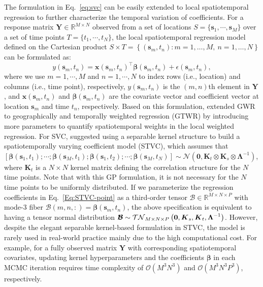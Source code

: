 \documentclass[12pt]{article}
\newcommand{\R}{\mathbb{R}}
\newcommand{\bd}[1]{\boldsymbol{#1}}
\begin{document}
The formulation in Eq.~\eqref{eq:svc} can be easily extended to local spatiotemporal regression to further characterize the temporal variation of coefficients. For a response matrix  $\boldsymbol{Y}\in\mathbb{R}^{M\times N}$ observed from a set of locations $S=\{\bd{s}_1,\cdots,\bd{s}_M\}$ over a set of time points $T=\{t_1,\cdots,t_N\}$, the local spatiotemporal regression model defined on the Cartesian product $S \times T = \left\{\left(\bd{s}_m, t_n\right) : m =
1,\ldots, M, \  n = 1,\ldots, N\right\}$ can be formulated as:
\begin{equation} \label{Eq:STVC-point}
    y\left(\bd{s}_m,t_n\right)=\boldsymbol{x}\left(\bd{s}_m,t_n\right)^{\top}\boldsymbol{\beta}\left(\bd{s}_m,t_n\right)+\epsilon\left(\bd{s}_m,t_n\right),
\end{equation}
where we use $m=1,\cdots,M$ and $n=1,\cdots,N$ to index rows (i.e., location) and columns (i.e., time point), respectively, $y\left(\bd{s}_m,t_n\right)$ is the $(m,n)$th element in $\bd{Y}$, and $\boldsymbol{x}\left(\bd{s}_m,t_n\right)$  and $\bd{\beta}\left(\bd{s}_m,t_n\right)$ are the covariate vector and coefficient vector at location $\bd{s}_{m}$ and time $t_{n}$, respectively. Based on this formulation, \citet{huang2010geographically} extended GWR to geographically and temporally weighted regression (GTWR) by introducing more parameters to quantify spatiotemporal weights in the local weighted regression. For SVC, \citet{gelfand2003spatial} suggested using a separable kernel structure to build a spatiotemporally varying coefficient model (STVC), which assumes that $\left[\boldsymbol{\beta}\left(\bd{s}_1,t_1\right);\cdots;\bd{\beta}\left(\bd{s}_M,t_1\right);\bd{\beta}\left(\bd{s}_1,t_2\right);\cdots;\boldsymbol{\beta}\left(\bd{s}_M,t_N\right) \right]\sim \mathcal{N}(\bd{0}, \bd{K}_t\otimes \bd{K}_s \otimes \bd{\Lambda}^{-1})$, where $\bd{K}_t$ is a $N\times N$ kernel matrix defining the correlation structure for the $N$ time points. Note that with this GP formulation, it is not necessary for the $N$ time points to be uniformly distributed. If we parameterize the regression coefficients in Eq.~\eqref{Eq:STVC-point} as a third-order tensor $\bd{\mathcal{B}}\in \R^{M\times N\times P}$ with mode-3 fiber  $\bd{\mathcal{B}}(m,n,:)=\boldsymbol{\beta}\left(\bd{s}_m,t_n\right)$, the above specification is equivalent to having a tensor normal distribution $\bd{\cal{B}}\sim \mathcal{TN}_{M\times N\times P}\left(\bd{0},\bd{K}_s,\bd{K}_t,\bd{\Lambda}^{-1} \right)$. %
However, despite the elegant 
separable kernel-based formulation in STVC, the model is rarely used in real-world practice mainly due to the high computational cost. For example, for a fully observed matrix $\bd{Y}$ with corresponding spatiotemporal covariates, updating kernel hyperparameters and the coefficients $\bd{\beta}$ in each MCMC iteration requires time complexity of $\mathcal{O}\left(M^3N^3\right)$ and $\mathcal{O}\left(M^3N^3P^3\right)$, respectively.%
\end{document}
